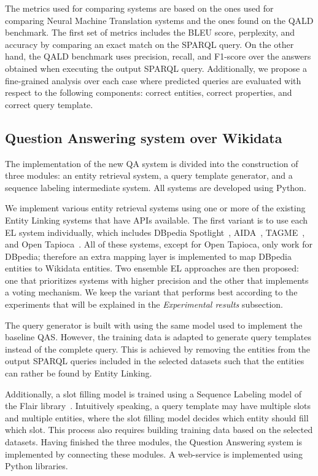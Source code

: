 The metrics used for comparing systems are based on the ones used for comparing Neural 
Machine Translation systems and the ones found on the QALD benchmark. The first set of 
metrics includes the BLEU score, perplexity, and accuracy by comparing an exact match on 
the SPARQL query. On the other hand, the QALD benchmark uses precision, recall, and F1-score 
over the answers obtained when executing the output SPARQL query. Additionally, 
we propose a fine-grained analysis over each case where predicted queries are evaluated with 
respect to the following components: correct entities, correct properties, and correct query 
template.

\subsection*{Question Answering system over Wikidata}
The implementation of the new QA system is divided into the construction of three modules: 
an entity retrieval system, a query template generator, and a sequence labeling intermediate 
system. All systems are developed using Python.

We implement various entity retrieval systems using one or more of the existing Entity 
Linking systems that have APIs available. The first variant is to use each EL system individually, 
which includes DBpedia Spotlight~\cite{EL:dbpedia-spotlight-MendesJGB11}, AIDA~\cite{EL:aida-tool-YosefHBSW11}, 
TAGME~\cite{EL:tagme-FerraginaS10}, and Open Tapioca~\cite{EL:opentapioca-Delpeuch19}. 
All of these systems, except for Open Tapioca, only work for DBpedia; therefore an 
extra mapping layer is implemented to map DBpedia entities to Wikidata entities. Two ensemble 
EL approaches are then proposed: one that prioritizes systems with higher precision 
and the other that implements a voting mechanism. We keep the variant that performs best 
according to the experiments that will be explained in the \textit{Experimental results} subsection.

The query generator is built with using the same model used to implement the baseline QAS. 
However, the training data is adapted to generate query templates instead of the complete 
query. This is achieved by removing the entities from the output SPARQL queries included 
in the selected datasets such that the entities can rather be found by Entity Linking.

Additionally, a slot filling model is trained using a Sequence Labeling model of the Flair 
library~\cite{seqlab:flair-AkbikBBRSV19}. Intuitively speaking, a query template may have 
multiple slots and multiple entities, where the slot filling model decides which entity should fill which slot.
This process also requires building training data based on the selected datasets. 
Having finished the three modules, the Question Answering system is implemented by 
connecting these modules. A web-service is implemented using Python libraries.

